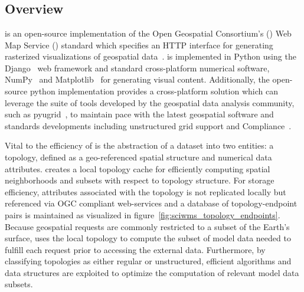 \section{\sciwms{}}
\label{sec:sciwms}
\subsection{Overview}
\Sciwms{} is an open-source implementation of the Open Geospatial
Consortium's (\ogc{}) Web Map Service (\wms{}) standard which
specifies an HTTP interface for generating rasterized visualizations
of geospatial data~\cite{wms14}. \sciwms{} is implemented in Python
using the Django~\cite{django} web framework and standard
cross-platform numerical software, NumPy~\cite{numpy11} and
Matplotlib~\cite{hunter07} for generating visual
content. Additionally, the open-source python implementation provides
a cross-platform \wms{} solution which can leverage the suite of tools
developed by the geospatial data analysis community, such as
pyugrid~\cite{pyugrid}, to maintain pace with the latest geospatial
software and standards developments including unstructured grid support
and \cfugrid{} Compliance~\cite{cfugrid}.



Vital to the efficiency of \sciwms{} is the abstraction of a dataset
into two entities: a topology, defined as a geo-referenced spatial
structure and numerical data attributes. \Sciwms{} creates a local
topology cache for efficiently computing spatial neighborhoods and
subsets with respect to topology structure. For storage efficiency,
attributes associated with the topology is not replicated locally but
referenced via OGC compliant web-services and a database of
topology-endpoint pairs is maintained as visualized in
figure~\ref{fig:sciwms_topology_endpoints}. Because geospatial \wms{}
requests are commonly restricted to a subset of the Earth's surface,
\sciwms{} uses the local topology to compute the subset of model data
needed to fulfill each request prior to accessing the external
data. Furthermore, by classifying topologies as either regular or
unstructured, efficient algorithms and data structures are exploited
to optimize the computation of relevant model data subsets.

